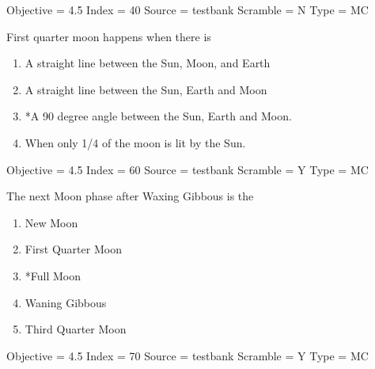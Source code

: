 \documentclass[11pt]{article}
\begin{document}
\begin{enumerate}
\begin{minipage}{\textwidth}
\begin{minipage}{\textwidth}
Objective = 4.5
Index = 40
Source = testbank
Scramble = N
Type = MC
\end{minipage}
\end{minipage}
\vskip 0.20in

\begin{minipage}{\textwidth}
\begin{minipage}{\textwidth}
\item First quarter moon happens when there is
\begin{enumerate} 
\setlength{\itemsep}{1pt} 
\setlength{\parskip}{0pt} 
\setlength{\parsep}{0pt}
\setlength{\multicolsep}{1pt} 
\item A straight line between the Sun, Moon, and Earth
\item A straight line between the Sun, Earth and Moon
\item *A 90 degree angle between the Sun, Earth and Moon.
\item When only 1/4 of the moon is lit by the Sun.
\end{enumerate} 
Objective = 4.5
Index = 60
Source = testbank
Scramble = Y
Type = MC
\end{minipage}
\end{minipage}
\vskip 0.20in

\begin{minipage}{\textwidth}
\begin{minipage}{\textwidth}
\item The next Moon phase after Waxing Gibbous is the
\begin{multicols}{3}
\begin{enumerate} 
\setlength{\itemsep}{1pt} 
\setlength{\parskip}{0pt} 
\setlength{\parsep}{0pt}
\setlength{\multicolsep}{1pt} 
\item New Moon
\item First Quarter Moon
\item *Full Moon
\item Waning Gibbous
\item Third Quarter Moon
\end{enumerate} 
\vfill 
\end{multicols}

Objective = 4.5
Index = 70
Source = testbank
Scramble = Y
Type = MC
\end{minipage}
\end{minipage}
\vskip 0.20in


\end{enumerate}
\end{document}
